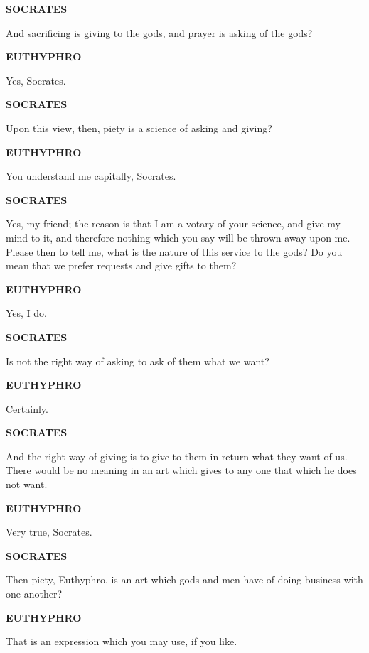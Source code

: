 \documentclass[11pt,letter]{article}
\begin{document}
\par \textbf{SOCRATES}
\par   And sacrificing is giving to the gods, and prayer is asking of the gods?

\par \textbf{EUTHYPHRO}
\par   Yes, Socrates.

\par \textbf{SOCRATES}
\par   Upon this view, then, piety is a science of asking and giving?

\par \textbf{EUTHYPHRO}
\par   You understand me capitally, Socrates.

\par \textbf{SOCRATES}
\par   Yes, my friend; the reason is that I am a votary of your science, and give my mind to it, and therefore nothing which you say will be thrown away upon me. Please then to tell me, what is the nature of this service to the gods? Do you mean that we prefer requests and give gifts to them?

\par \textbf{EUTHYPHRO}
\par   Yes, I do.

\par \textbf{SOCRATES}
\par   Is not the right way of asking to ask of them what we want?

\par \textbf{EUTHYPHRO}
\par   Certainly.

\par \textbf{SOCRATES}
\par   And the right way of giving is to give to them in return what they want of us. There would be no meaning in an art which gives to any one that which he does not want.

\par \textbf{EUTHYPHRO}
\par   Very true, Socrates.

\par \textbf{SOCRATES}
\par   Then piety, Euthyphro, is an art which gods and men have of doing business with one another?

\par \textbf{EUTHYPHRO}
\par   That is an expression which you may use, if you like.
\end{document}

